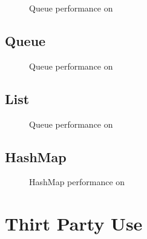 \begin{figure}[ht]
  \centering
  \caption{Queue performance on \gribb}
\end{figure}



\clearpage
\subsection{Queue\label{sec:res-queue}}

\begin{figure}[ht]
  \centering
  \caption{Queue performance on \gribb}
\end{figure}



\clearpage
\subsection{List\label{sec:res-list}}

\begin{figure}[ht]
  \centering
  \caption{Queue performance on \gribb}
\end{figure}



\clearpage
\subsection{HashMap\label{sec:res-hm}}

\begin{figure}[ht]
  \centering
  \caption{HashMap performance on \gribb}
\end{figure}

\section{Thirt Party Use}
\lorem{}
